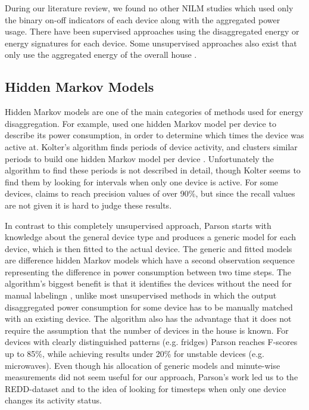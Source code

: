 \documentclass{article}
\begin{document}
During our literature review, we found no other NILM studies which used only the binary on-off indicators of each device along with the aggregated power usage.
There have been supervised approaches using the disaggregated energy\cite{Kelly} or energy signatures \cite{Parson} for each device.
Some unsupervised approaches also exist that only use the aggregated energy of the overall house \cite{Kolter}.

\subsection{Hidden Markov Models}
Hidden Markov models are one of the main categories of methods used for energy disaggregation.
For example, \cite{Kolter} used one hidden Markov model per device to describe its power consumption, in order to determine which times the device was active at.
Kolter's algorithm finds periods of device activity, and clusters similar periods to build one hidden Markov model per device \cite{Kolter}.
Unfortunately the algorithm to find these periods is not described in detail, though Kolter seems to find them by looking for intervals when only one device is active.
For some devices, \cite{Kolter} claims to reach precision values of over 90\%, but since the recall values are not given it is hard to judge these results.

In contrast to this completely unsupervised approach, Parson \cite{Parson} starts with knowledge about the general device type and produces a generic model for each device, which is then fitted to the actual device.
The generic and fitted models are difference hidden Markov models \cite{Kolter} which have a second observation sequence representing the difference in power consumption between two time steps.
The algorithm's biggest benefit is that it identifies the devices without the need for manual labelingn \cite{Parson}, unlike most unsupervised methods in which the output disaggregated power consumption for some device has to be manually matched with an existing device.
The algorithm also has the advantage that it does not require the assumption that the number of devices in the house is known.
For devices with clearly distinguished patterns (e.g. fridges) Parson reaches F-scores up to 85\%, while achieving results under 20\% for unstable devices (e.g. microwaves).
Even though his allocation of generic models and minute-wise measurements did not seem useful for our approach, Parson's work led us to the REDD-dataset and to the idea of looking for timesteps when only one device changes its activity status.
\end{document}
